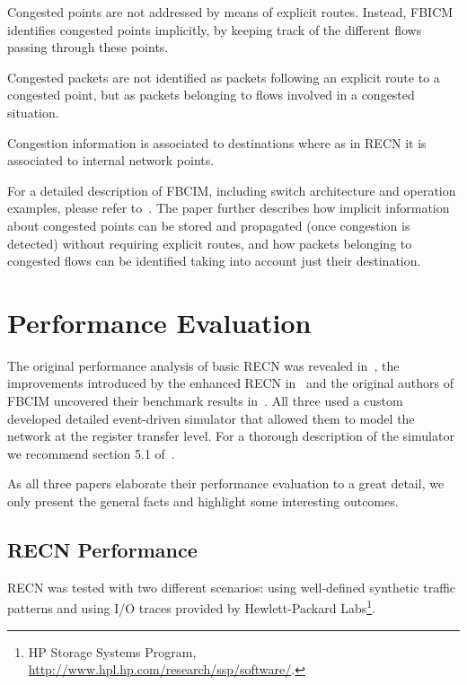 \begin{list}{.~}{}
\item Congested points are not addressed by means of explicit routes. Instead, FBICM identifies congested points implicitly, by keeping track of the different flows passing through these points.
\item Congested packets are not identified as packets following an explicit route to a congested point, but as packets belonging to flows involved in a congested situation.
\item Congestion information is associated to destinations where as in RECN it is associated
to internal network points.
\end{list}

For a detailed description of FBCIM, including switch architecture and operation examples, please refer to~\cite{paper3}. The paper further describes how implicit information about congested points can be stored and propagated (once congestion is detected) without requiring explicit routes, and how packets belonging to congested flows can be identified taking into account just their destination.

\section{Performance Evaluation}\label{S:performance}

The original performance analysis of basic RECN was revealed in~\cite{paper2}, the improvements introduced by the enhanced RECN in~\cite{paper1} and the original authors of FBCIM uncovered their benchmark results in~\cite{paper3}. All three used a custom developed detailed event-driven simulator that allowed them to model the network at the register transfer level. For a thorough description of the simulator we recommend section 5.1 of~\cite{paper1}.

As all three papers elaborate their performance evaluation to a great detail, we only present the general facts and highlight some interesting outcomes.

\subsection{RECN Performance}\label{S:recn_perf}

RECN was tested with two different scenarios: using well-defined synthetic traffic patterns and using I/O traces provided by Hewlett-Packard Labs\footnote{HP Storage Systems Program, \url{http://www.hpl.hp.com/research/ssp/software/}.}. 

